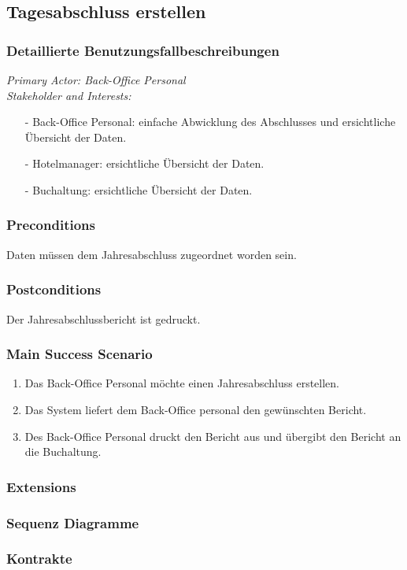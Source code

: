 \documentclass[./detailed_overview_usecases.tex]{subfiles}
\begin{document}
    \subsection{Tagesabschluss erstellen}
    \subsubsection{Detaillierte Benutzungsfallbeschreibungen}
    \textit{Primary Actor: Back-Office Personal}
    \\
    \textit{Stakeholder and Interests:}
    \begin{itemize}
        \item[-] Back-Office Personal: einfache Abwicklung des Abschlusses und ersichtliche Übersicht der Daten.
        \item[-] Hotelmanager: ersichtliche Übersicht der Daten.
        \item[-] Buchaltung: ersichtliche Übersicht der Daten.
    \end{itemize}

    \subsubsection*{Preconditions}
    Daten müssen dem Jahresabschluss zugeordnet worden sein.
    \subsubsection*{Postconditions}
    Der Jahresabschlussbericht ist gedruckt.

    \subsubsection*{Main Success Scenario}
    \begin{enumerate}
        \item Das Back-Office Personal möchte einen Jahresabschluss erstellen.
        \item Das System liefert dem Back-Office personal den gewünschten Bericht.
        \item Des Back-Office Personal druckt den Bericht aus und übergibt den Bericht an die Buchaltung.
    \end{enumerate}

    \subsubsection*{Extensions}

    \subsubsection{Sequenz Diagramme}
    \subsubsection{Kontrakte}
\end{document}
